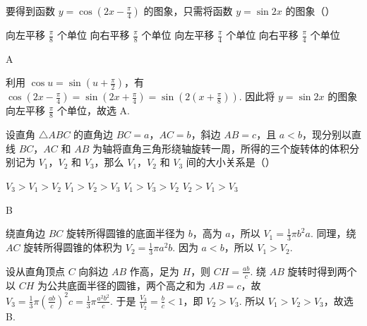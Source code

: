 \begin{problem}
要得到函数 \(y=\cos\left( 2x-\frac{\pi}{4} \right)\) 的图象，只需将函数 \(y=\sin 2x\) 的图象（\quad）

\choices
    {向左平移 \(\frac{\pi}{8}\) 个单位}
    {向右平移 \(\frac{\pi}{8}\) 个单位}
    {向左平移 \(\frac{\pi}{4}\) 个单位}
    {向右平移 \(\frac{\pi}{4}\) 个单位}
\end{problem}

\begin{answer}
A
\end{answer}

\begin{solution}
利用 \(\cos u=\sin\left(u+\frac{\pi}{2}\right)\)，有 \(\cos\left(2x-\frac{\pi}{4}\right)=\sin\left(2x+\frac{\pi}{4}\right)=\sin\left(2\left(x+\frac{\pi}{8}\right)\right)\). 因此将 \(y=\sin2x\) 的图象向左平移 \(\frac{\pi}{8}\) 个单位，故选 A.
\end{solution}

\begin{problem}
设直角 \(\triangle ABC\) 的直角边 \(BC=a\)，\(AC=b\)，斜边 \(AB=c\)，且 \(a<b\)，现分别以直线 \(BC\)，\(AC\) 和 \(AB\) 为轴将直角三角形绕轴旋转一周，所得的三个旋转体的体积分别记为 \(V_1\)，\(V_2\) 和 \(V_3\)，那么 \(V_1\)，\(V_2\) 和 \(V_3\) 间的大小关系是（\quad）

\choices
    {\(V_3>V_1>V_2\)}
    {\(V_1>V_2>V_3\)}
    {\(V_1>V_3>V_2\)}
    {\(V_2>V_1>V_3\)}
\end{problem}

\begin{answer}
B
\end{answer}

\begin{solution}
绕直角边 \(BC\) 旋转所得圆锥的底面半径为 \(b\)，高为 \(a\)，所以 \(V_1=\frac{1}{3}\pi b^2a\). 同理，绕 \(AC\) 旋转所得圆锥的体积为 \(V_2=\frac{1}{3}\pi a^2b\). 因为 \(a<b\)，所以 \(V_1>V_2\).

设从直角顶点 \(C\) 向斜边 \(AB\) 作高，足为 \(H\)，则 \(CH=\frac{ab}{c}\). 绕 \(AB\) 旋转时得到两个以 \(CH\) 为公共底面半径的圆锥，两个高之和为 \(AB=c\)，故 \(V_3=\frac{1}{3}\pi\left(\frac{ab}{c}\right)^2c=\frac{1}{3}\pi\frac{a^2b^2}{c}\). 于是 \(\frac{V_3}{V_2}=\frac{b}{c}<1\)，即 \(V_2>V_3\). 所以 \(V_1>V_2>V_3\)，故选 B.
\end{solution}


